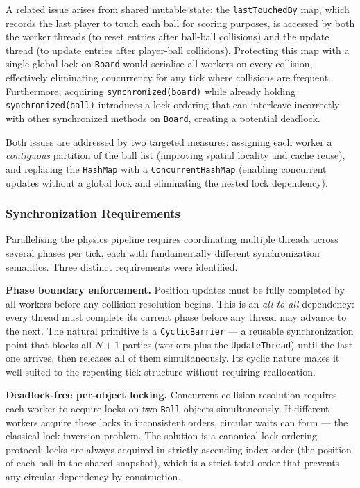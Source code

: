 \documentclass[12pt,a4paper]{article}
\begin{document}
A related issue arises from shared mutable state: the \texttt{lastTouchedBy}
map, which records the last player to touch each ball for scoring purposes,
is accessed by both the worker threads (to reset entries after ball-ball
collisions) and the update thread (to update entries after player-ball
collisions). Protecting this map with a single global lock on \texttt{Board}
would serialise all workers on every collision, effectively eliminating
concurrency for any tick where collisions are frequent. Furthermore, acquiring
\texttt{synchronized(board)} while already holding \texttt{synchronized(ball)}
introduces a lock ordering that can interleave incorrectly with other
synchronized methods on \texttt{Board}, creating a potential deadlock.

Both issues are addressed by two targeted measures: assigning each worker a
\emph{contiguous} partition of the ball list (improving spatial locality and
cache reuse), and replacing the \texttt{HashMap} with a
\texttt{ConcurrentHashMap} (enabling concurrent updates without a global lock
and eliminating the nested lock dependency).


\subsubsection{Synchronization Requirements}

Parallelising the physics pipeline requires coordinating multiple threads
across several phases per tick, each with fundamentally different
synchronization semantics. Three distinct requirements were identified.

\textbf{Phase boundary enforcement.} Position updates must be fully completed
by all workers before any collision resolution begins. This is an
\emph{all-to-all} dependency: every thread must complete its current phase
before any thread may advance to the next. The natural primitive is a
\texttt{CyclicBarrier} — a reusable synchronization point that blocks all
$N+1$ parties (workers plus the \texttt{UpdateThread}) until the last one
arrives, then releases all of them simultaneously. Its cyclic nature makes it
well suited to the repeating tick structure without requiring reallocation.

\textbf{Deadlock-free per-object locking.} Concurrent collision resolution
requires each worker to acquire locks on two \texttt{Ball} objects
simultaneously. If different workers acquire these locks in inconsistent
orders, circular waits can form — the classical lock inversion problem. The
solution is a canonical lock-ordering protocol: locks are always acquired in
strictly ascending index order (the position of each ball in the shared
snapshot), which is a strict total order that prevents any circular dependency
by construction.
\end{document}
